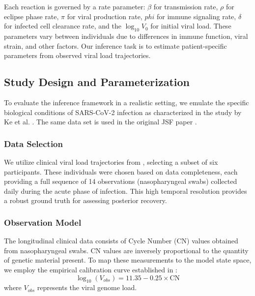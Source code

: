 \documentclass{article}
\begin{document}
Each reaction is governed by a rate parameter: $\beta$ for transmission rate, $\rho$ for eclipse phase rate, $\pi$ for viral production rate, $phi$ for immune signaling rate, $\delta$ for infected cell clearance rate, and the $\log_{10} V_0$ for initial viral load. These parameters vary between individuals due to differences in immune function, viral strain, and other factors. Our inference task is to estimate patient-specific parameters from observed viral load trajectories. 



\subsection{Study Design and Parameterization}

To evaluate the inference framework in a realistic setting, we emulate the specific biological conditions of SARS-CoV-2 infection as characterized in the study by Ke et al. \cite{Ke2022SarsData}. The same data set is used in the original JSF paper \cite{Germano2024JSF}.

\subsubsection{Data Selection}
We utilize clinical viral load trajectories from \cite{Ke2022SarsData}, selecting a subset of six participants. These individuals were chosen based on data completeness, each providing a full sequence of 14 observations (nasopharyngeal swabs) collected daily during the acute phase of infection. This high temporal resolution provides a robust ground truth for assessing posterior recovery.



\subsubsection{Observation Model}

The longitudinal clinical data consists of Cycle Number (CN) values obtained from nasopharyngeal swabs. CN values are inversely proportional to the quantity of genetic material present. To map these measurements to the model state space, we employ the empirical calibration curve established in \cite{Ke2022SarsData}:
\begin{equation}
    \log_{10}(V_{obs}) = 11.35 - 0.25 \times \text{CN}
\end{equation}
where $V_{obs}$ represents the viral genome load.
\end{document}
